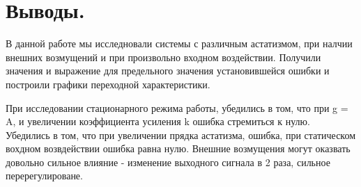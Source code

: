 \documentclass[a3paper, 11pt]{article}
\begin{document}
\section*{Выводы.}
В данной работе мы исследновали системы с различным астатизмом, при налчии внешних возмущений и при произвольно входном воздействии. Получили значения и выражение для предельного значения установившейся ошибки и построили графики переходной характеристики. \par
При исследовании стационарного режима работы, убедились в том, что при g = A, и увеличении коэффициента усиления k ошибка стремиться к нулю. 
Убедились в том, что при увеличении прядка астатизма, ошибка, при статическом вохдном возвдействии ошибка равна нулю.
Внешние возмущения могут оказвать довольно сильное влияние - изменение выходного сигнала в 2 раза, сильное перерегулироване.
\end{document}
